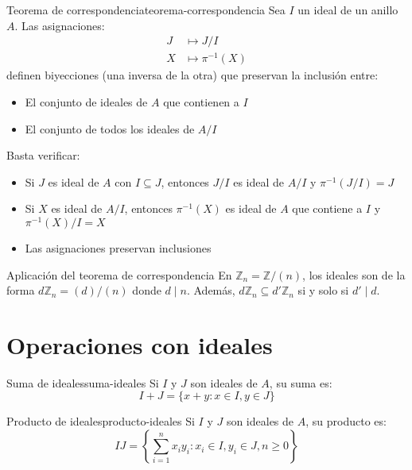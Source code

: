 \begin{theorem}{Teorema de correspondencia}{teorema-correspondencia}
    Sea \(I\) un ideal de un anillo \(A\). Las asignaciones:
    \begin{align*}
        J &\mapsto J/I \\
        X &\mapsto \pi^{-1}(X)
    \end{align*}
    definen biyecciones (una inversa de la otra) que preservan la inclusión entre:
    \begin{itemize}
        \item El conjunto de ideales de \(A\) que contienen a \(I\)
        \item El conjunto de todos los ideales de \(A/I\)
    \end{itemize}
\end{theorem}

\begin{proofbox}
    Basta verificar:
    \begin{itemize}
        \item Si \(J\) es ideal de \(A\) con \(I \subseteq J\), entonces \(J/I\) es ideal de \(A/I\) y \(\pi^{-1}(J/I) = J\)
        \item Si \(X\) es ideal de \(A/I\), entonces \(\pi^{-1}(X)\) es ideal de \(A\) que contiene a \(I\) y \(\pi^{-1}(X)/I = X\)
        \item Las asignaciones preservan inclusiones
    \end{itemize}
\end{proofbox}

\begin{example}{Aplicación del teorema de correspondencia}{}
    En \(\mathbb{Z}_n = \mathbb{Z}/(n)\), los ideales son de la forma \(d\mathbb{Z}_n = (d)/(n)\) donde \(d \mid n\). Además, \(d\mathbb{Z}_n \subseteq d'\mathbb{Z}_n\) si y solo si \(d' \mid d\).
\end{example}

\clearpage

\section{Operaciones con ideales}

\begin{definition}{Suma de ideales}{suma-ideales}
    Si \(I\) y \(J\) son ideales de \(A\), su {suma} es:
    \[
    I + J = \{x + y : x \in I, y \in J\}
    \]
\end{definition}

\begin{definition}{Producto de ideales}{producto-ideales}
    Si \(I\) y \(J\) son ideales de \(A\), su {producto} es:
    \[
    IJ = \left\{\sum_{i=1}^n x_i y_i : x_i \in I, y_i \in J, n \geq 0\right\}
    \]
\end{definition}


